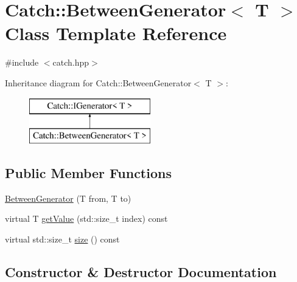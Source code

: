 \hypertarget{class_catch_1_1_between_generator}{}\section{Catch\+:\+:Between\+Generator$<$ T $>$ Class Template Reference}
\label{class_catch_1_1_between_generator}


{\ttfamily \#include $<$catch.\+hpp$>$}

Inheritance diagram for Catch\+:\+:Between\+Generator$<$ T $>$\+:\begin{figure}[H]
\begin{center}
\leavevmode
\includegraphics[height=2.000000cm]{class_catch_1_1_between_generator}
\end{center}
\end{figure}
\subsection*{Public Member Functions}
\begin{DoxyCompactItemize}
\item 
\mbox{\hyperlink{class_catch_1_1_between_generator_a835a057d691ae37caef660624099b51c}{Between\+Generator}} (T from, T to)
\item 
virtual T \mbox{\hyperlink{class_catch_1_1_between_generator_a913f74bb0c23b3bc0127abfffdabbd94}{get\+Value}} (std\+::size\+\_\+t index) const
\item 
virtual std\+::size\+\_\+t \mbox{\hyperlink{class_catch_1_1_between_generator_af65a1fe51f9b1106fc676e3dd189adb6}{size}} () const
\end{DoxyCompactItemize}


\subsection{Constructor \& Destructor Documentation}
\mbox{\label{class_catch_1_1_between_generator_a835a057d691ae37caef660624099b51c}} 
